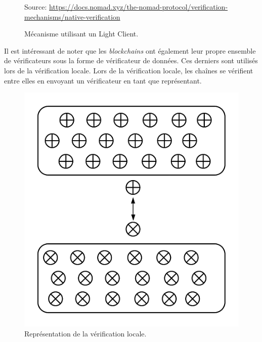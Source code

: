 \begin{figure}[h!]
    \centering
{}
    {\scriptsize
            Source: \url{https://docs.nomad.xyz/the-nomad-protocol/verification-mechanisms/native-verification}}
    \caption{Mécanisme utilisant un Light Client.}
    \label{fig:LightClient}
\end{figure}

\pagebreak
Il est intéressant de noter que les \textit{\gls{blockchain}s} ont également leur propre ensemble de vérificateurs sous la forme de vérificateur de données. Ces derniers sont utilisés lors de la vérification locale. Lors de la vérification locale, les chaînes se vérifient entre elles en envoyant un vérificateur en tant que représentant.

\begin{figure}[h]
    \centering
\includegraphics[scale=0.70]{centralisation/imagesBridges/DiagrammeVerifLocale.png}
\caption{Représentation de la vérification locale.}
\label{fig:LocaleVerif}
\end{figure}

